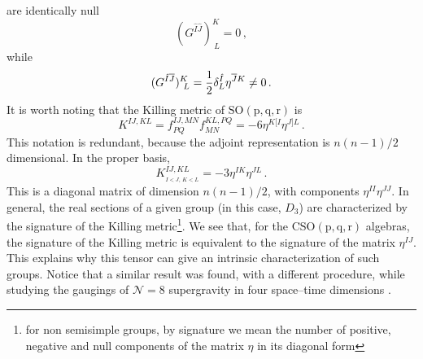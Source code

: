 \documentclass[a4paper,12pt]{article}
\def\bar{\overline}\end {picture}}
\begin{document}
are identically null
\begin{equation}
(G^{\hat{I}\hat{J}})^K_{~L}=0\,, \label{zerogen}
\end{equation}
while
\begin{equation}
(G^{\hat{I}\bar{J}})^K_{~L}={1\over
2}\delta^{\hat{I}}_L\eta^{\bar{J}K}\neq 0\,.
\end{equation}
It is worth noting that the Killing metric of $\mathrm{SO(p,q,r)}$
is
\begin{equation}
K^{IJ,KL}=f^{IJ,MN}_{PQ}f^{KL,PQ}_{MN}=-6\eta^{K[I}\eta^{J]L}\,.
\end{equation}
This notation is redundant, because the adjoint representation is
$n(n-1)/2$ dimensional. In the proper basis,
\begin{equation}
K^{IJ,KL}_{_{I<J,\,K<L}}=-3\eta^{IK}\eta^{JL}\,.
\end{equation}
This is a diagonal matrix of dimension $n(n-1)/2$, with components
$\eta^{II}\eta^{JJ}$. In general, the real sections of a given
group (in this case, $D_3$) are characterized by the signature of
the Killing metric\footnote{for non semisimple groups, by
signature we mean the number of positive, negative and null
components of the matrix $\eta$ in its diagonal form}. We see
that, for the $\mathrm{CSO}\mathrm{(p,q,r)}$ algebras, the
signature of the Killing metric is equivalent to the signature of
the matrix $\eta^{IJ}$. This explains why this tensor can give an
intrinsic characterization of such groups. Notice that a similar
result was found, with a different procedure, while studying the
gaugings of $\mathcal{N}=8$ supergravity in four space--time
dimensions \cite{noi4D}.
\end{document}
